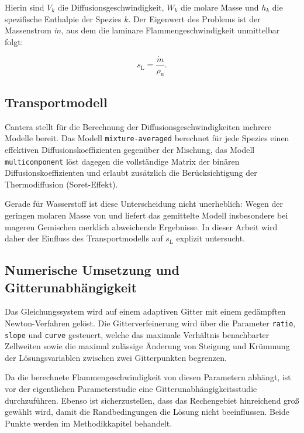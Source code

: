 Hierin sind $V_k$ die Diffusionsgeschwindigkeit, $W_k$ die molare Masse und
$h_k$ die spezifische Enthalpie der Spezies $k$. Der Eigenwert des Problems
ist der Massenstrom $\dot{m}$, aus dem die laminare Flammengeschwindigkeit
unmittelbar folgt:

\begin{equation}
	\label{eq:sl_aus_massenstrom}
	s_\mathrm{L} = \frac{\dot{m}}{\rho_\mathrm{u}}.
\end{equation}

\subsection{Transportmodell}\label{subsec:transport}

Cantera stellt für die Berechnung der Diffusionsgeschwindigkeiten mehrere
Modelle bereit. Das Modell \texttt{mixture-averaged} berechnet für jede Spezies
einen effektiven Diffusionskoeffizienten gegenüber der Mischung, das Modell
\texttt{multicomponent} löst dagegen die vollständige Matrix der binären
Diffusionskoeffizienten und erlaubt zusätzlich die Berücksichtigung der
Thermodiffusion (Soret-Effekt).

Gerade für Wasserstoff ist diese Unterscheidung nicht unerheblich: Wegen der
geringen molaren Masse von  und  liefert das gemittelte Modell
insbesondere bei mageren Gemischen merklich abweichende Ergebnisse. In dieser
Arbeit wird daher der Einfluss des Transportmodells auf $s_\mathrm{L}$
explizit untersucht.

\subsection{Numerische Umsetzung und Gitterunabhängigkeit}\label{subsec:numerik}

Das Gleichungssystem wird auf einem adaptiven Gitter mit einem gedämpften
Newton-Verfahren gelöst. Die Gitterverfeinerung wird über die Parameter
\texttt{ratio}, \texttt{slope} und \texttt{curve} gesteuert, welche das
maximale Verhältnis benachbarter Zellweiten sowie die maximal zulässige
Änderung von Steigung und Krümmung der Lösungsvariablen zwischen zwei
Gitterpunkten begrenzen.

Da die berechnete Flammengeschwindigkeit von diesen Parametern abhängt, ist
vor der eigentlichen Parameterstudie eine Gitterunabhängigkeitsstudie
durchzuführen. Ebenso ist sicherzustellen, dass das Rechengebiet hinreichend
groß gewählt wird, damit die Randbedingungen die Lösung nicht beeinflussen.
Beide Punkte werden im Methodikkapitel behandelt.

